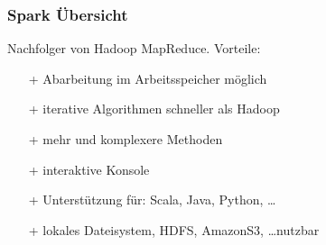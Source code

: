 \begin{frame}
    \frametitle{Spark Übersicht}
    Nachfolger von Hadoop MapReduce. Vorteile:
    \begin{itemize}
        \item[+] Abarbeitung im Arbeitsspeicher möglich %
        \item[+] iterative Algorithmen schneller als Hadoop %
        \item[+] mehr und komplexere Methoden %
        \item[+] interaktive Konsole %
        \item[+] Unterstützung für: Scala, Java, Python, \ldots
        \item[+] lokales Dateisystem, HDFS, AmazonS3, \ldots nutzbar %
    \end{itemize}
\end{frame}

